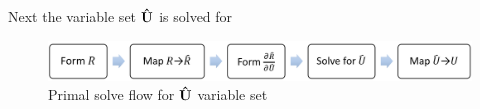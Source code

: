 \documentclass{article}   	%
\begin{document}
Next the variable set $\mathbf{\hat{U}}$ is solved for
\begin{figure}[h]
  \centering
  \includegraphics[width=\textwidth]{dc_solve_flow.png}
  \caption{Primal solve flow for $\mathbf{\hat{U}}$ variable set}
  \label{fig:dc-solve-flow}
\end{figure}
\end{document}

